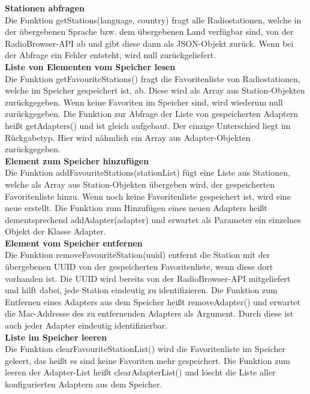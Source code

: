 \documentclass[11pt, twoside]{article}
\begin{document}
\textbf{Stationen abfragen} \\
Die Funktion getStations(language, country) fragt alle Radiostationen, welche in der übergebenen Sprache bzw. dem übergebenen Land verfügbar sind, von der RadioBrowser-API ab und gibt diese dann als JSON-Objekt zurück. Wenn bei der Abfrage ein Fehler entsteht, wird null zurückgeliefert. \newline \\
\textbf{Liste von Elementen vom Speicher lesen} \\
Die Funktion getFavouriteStations() fragt die Favoritenliste von Radiostationen, welche im Speicher gespeichert ist, ab. Diese wird als Array aus Station-Objekten zurückgegeben. Wenn keine Favoriten im Speicher sind, wird wiederum null zurückgegeben. Die Funktion zur Abfrage der Liste von gespeicherten Adaptern heißt getAdapters() und ist gleich aufgebaut. Der einzige Unterschied liegt im Rückgabetyp. Hier wird nähmlich ein Array aus Adapter-Objekten zurückgegeben.
\newline \\
\textbf{Element zum Speicher hinzufügen} \\
Die Funktion addFavouriteStations(stationList) fügt eine Liste aus Stationen, welche als Array aus Station-Objekten übergeben wird, der gespeicherten Favoritenliste hinzu. Wenn noch keine Favoritenliste gespeichert ist, wird eine neue erstellt. Die Funktion zum Hinzufügen eines neuen Adapters heißt dementsprechend addAdapter(adapter) und erwartet als Parameter ein einzelnes Objekt der Klasse Adapter.
\newline \\
\textbf{Element vom Speicher entfernen} \\
Die Funktion removeFavouriteStation(uuid) entfernt die Station mit der übergebenen UUID von der gespeicherten Favoritenliste, wenn diese dort vorhanden ist. Die UUID wird bereits von der RadioBrowser-API mitgeliefert und hilft dabei, jede Station eindeutig zu identifizieren. Die Funktion zum Entfernen eines Adapters aus dem Speicher heißt removeAdapter() und erwartet die Mac-Addresse des zu entfernenden Adapters als Argument. Durch diese ist auch jeder Adapter eindeutig identifizierbar. \newline \\
\textbf{Liste im Speicher leeren} \\
Die Funktion clearFavouriteStationList() wird die Favoritenliste im Speicher geleert, das heißt es sind keine Favoriten mehr gespeichert. Die Funktion zum leeren der Adapter-List heißt clearAdapterList() und löscht die Liste aller konfigurierten Adaptern aus dem Speicher.
\end{document}
